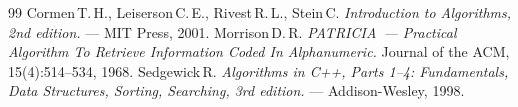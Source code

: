 \begin{thebibliography}{99}
Cormen\,T.\,H., Leiserson\,C.\,E., Rivest\,R.\,L., Stein\,C.
{\itshape Introduction to Algorithms, 2nd edition.} --- MIT Press, 2001.
Morrison\,D.\,R.
{\itshape PATRICIA~--- Practical Algorithm To Retrieve Information Coded In Alphanumeric.}
Journal of the ACM, 15(4):514--534, 1968.
Sedgewick\,R.
{\itshape Algorithms in C++, Parts 1--4: Fundamentals, Data Structures, Sorting, Searching, 3rd edition.} --- Addison-Wesley, 1998.
\end{thebibliography}
\pagebreak
